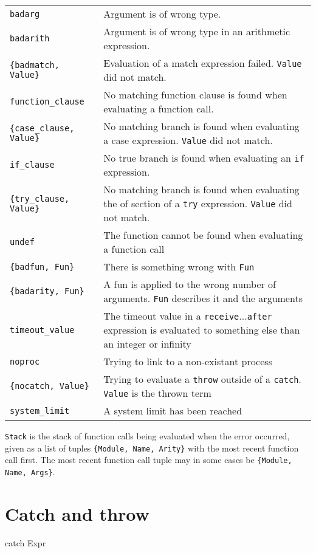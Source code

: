 \begin{center}
\begin{tabular}{|>{\raggedright}p{100pt}|>{\raggedright}p{226pt}|}
\hline
\multicolumn{2}{|p{326pt}|}{Exit reasons}\tabularnewline
\hline
\texttt{badarg}  & Argument is of wrong type. \tabularnewline
\hline
\texttt{badarith}  & Argument is of wrong type in an arithmetic expression. \tabularnewline
\hline
\texttt{\{badmatch, Value\}}  & Evaluation of a match expression failed. \texttt{Value} did not match.
\tabularnewline
\hline
\texttt{function\_clause}  & No matching function clause is found when evaluating a function
call. \tabularnewline
\hline
\texttt{\{case\_clause, Value\}}  & No matching branch is found when evaluating a case expression.
\texttt{Value} did not match. \tabularnewline
\hline
\texttt{if\_clause}  & No true branch is found when evaluating an \texttt{if} expression. \tabularnewline
\hline
\texttt{\{try\_clause, Value\}}  & No matching branch is found when evaluating the of section
of a \texttt{try} expression. \texttt{Value} did not match. \tabularnewline
\hline
\texttt{undef}  & The function cannot be found when evaluating a function call\tabularnewline
\hline
\texttt{\{badfun, Fun\}}  & There is something wrong with \texttt{Fun}\tabularnewline
\hline
\texttt{\{badarity, Fun\}}  & A fun is applied to the wrong number of arguments. \texttt{Fun} describes
it and the arguments\tabularnewline
\hline
\texttt{timeout\_value}  & The timeout value in a \texttt{receive}$...$\texttt{after} expression is evaluated
to something else than an integer or infinity\tabularnewline
\hline
\texttt{noproc}  & Trying to link to a non-existant process\tabularnewline
\hline
\texttt{\{nocatch, Value\}}  & Trying to evaluate a \texttt{throw} outside of a \texttt{catch}. \texttt{Value} is the thrown
term\tabularnewline
\hline
\texttt{system\_limit}  & A system limit has been reached\tabularnewline
\hline
\end{tabular}
\end{center}

\texttt{Stack} is the stack of function calls being evaluated when the error
occurred, given as a list of tuples \texttt{\{Module, Name, Arity\}}
with the most recent function call first.  The most recent function
call tuple may in some cases be \texttt{\{Module, Name, Args\}}.


\section{Catch and throw}
\label{errorhandling:catchthrow}
\begin{erlang}
catch Expr
\end{erlang}

